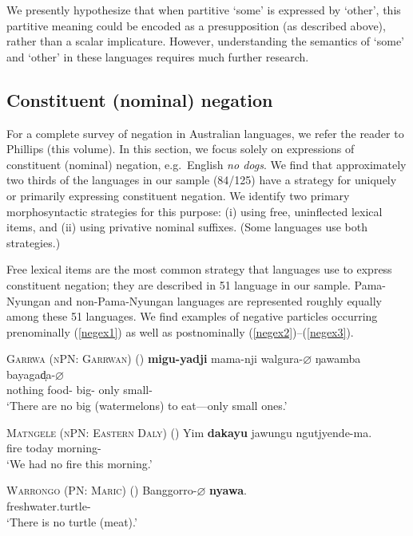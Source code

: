 \documentclass[12pt,egregdoesnotlikesansseriftitles]{scrartcl}
\newcommand{\ofy}{/125} %
\begin{document}
We presently hypothesize that when partitive `some' is expressed by `other', this partitive meaning could be encoded as a presupposition (as described above), rather than a scalar implicature.  However, understanding the semantics of `some' and `other' in these languages requires much further research.


\subsection{Constituent (nominal) negation}
\label{sec:neg}
For a complete survey of negation in Australian languages, we refer the reader to Phillips (this volume). In this section, we focus solely on expressions of constituent (nominal) negation, e.g.\ English \textit{no dogs}. We find that approximately two thirds of the languages in our sample (84\ofy) have a strategy for uniquely or primarily expressing constituent negation.  We identify two primary morphosyntactic  strategies for this purpose: (i) using free, uninflected lexical items, and (ii) using privative nominal suffixes. (Some languages use both strategies.)

Free lexical items are the most common strategy that languages use to express constituent negation; they are described in 51 language in our sample. Pama-Nyungan and non-Pama-Nyungan languages are represented roughly equally among these 51 languages. We find examples of negative particles occurring prenominally (\ref{negex1}) as well as postnominally (\ref{negex2})--(\ref{negex3}).

\begin{exe}
  \ex \textsc{Garrwa (nPN: Garrwan)} \hfill (\citealt[37]{furby77}) 
  \gll \textbf{migu-yadji}    mama-nji    walgura-$\varnothing$    ŋawamba    bayagad̩a-$\varnothing$\\
  nothing  food-\Refr{} big-\Nom{} only  small-\Nom\\
  \glt `There are no big (watermelons) to eat---only small ones.' \label{negex1}

  \ex \textsc{Matngele (nPN: Eastern Daly)} \hfill (\citealt[102]{zandvoort99})
  \gll Yim \textbf{dakayu} jawungu ngutjyende-ma.\\
  fire \Neg{} today morning-\Prm\\
  \glt `We had no fire this morning.' \label{negex2} %

  \ex \textsc{Warrongo (PN: Maric)} \hfill (\citealt[660]{tsunoda11})
  \gll Banggorro-$\varnothing$ \textbf{nyawa}.\\
  freshwater.turtle-\Nom{} \Neg\\
  \glt `There is no turtle (meat).' \label{negex3}
\end{exe}
 
\end{document}
